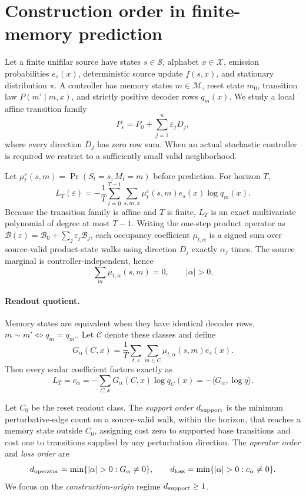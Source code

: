 \section{Construction order in finite-memory prediction}
\label{sec:order}

Let a finite unifilar source have states $s\in\mathcal S$, alphabet $x\in\mathcal X$, emission probabilities $e_s(x)$, deterministic source update $f(s,x)$, and stationary distribution $\pi$. A controller has memory states $m\in\mathcal M$, reset state $m_0$, transition law $P(m'\mid m,x)$, and strictly positive decoder rows $q_m(x)$. We study a local affine transition family
\[
P_\varepsilon=P_0+\sum_{j=1}^n\varepsilon_jD_j,
\]
where every direction $D_j$ has zero row sum. When an actual stochastic controller is required we restrict to a sufficiently small valid neighborhood.

Let $\mu_t^\varepsilon(s,m)=\Pr(S_t=s,M_t=m)$ before prediction. For horizon $T$,
\[
L_T(\varepsilon)=-\frac1T\sum_{t=0}^{T-1}\sum_{s,m,x}
\mu_t^\varepsilon(s,m)e_s(x)\log q_m(x).
\]
Because the transition family is affine and $T$ is finite, $L_T$ is an exact multivariate polynomial of degree at most $T-1$. Writing the one-step product operator as $\mathcal B(\varepsilon)=\mathcal B_0+\sum_j\varepsilon_j\mathcal B_j$, each occupancy coefficient $\mu_{t,\alpha}$ is a signed sum over source-valid product-state walks using direction $D_j$ exactly $\alpha_j$ times. The source marginal is controller-independent, hence
\[
\sum_m\mu_{t,\alpha}(s,m)=0,\qquad |\alpha|>0.
\]

\paragraph{Readout quotient.}
Memory states are equivalent when they have identical decoder rows, $m\sim m'\Leftrightarrow q_m=q_{m'}$. Let $\mathcal C$ denote these classes and define
\[
G_\alpha(C,x)=\frac1T\sum_{t,s}\sum_{m\in C}\mu_{t,\alpha}(s,m)e_s(x).
\]
Then every scalar coefficient factors exactly as
\begin{equation}
[\varepsilon^\alpha]L_T=c_\alpha
=-\sum_{C,x}G_\alpha(C,x)\log q_C(x)
=-\langle G_\alpha,\log q\rangle.
\label{eq:factorization}
\end{equation}

Let $C_0$ be the reset readout class. The \emph{support order} $d_{\mathrm{support}}$ is the minimum perturbative-edge count on a source-valid walk, within the horizon, that reaches a memory state outside $C_0$, assigning cost zero to supported base transitions and cost one to transitions supplied by any perturbation direction. The \emph{operator order} and \emph{loss order} are
\[
\doperator=\min\{|\alpha|>0:G_\alpha\neq0\},\qquad
\dloss=\min\{|\alpha|>0:c_\alpha\neq0\}.
\]
We focus on the \emph{construction-origin} regime $d_{\mathrm{support}}\geq1$.

